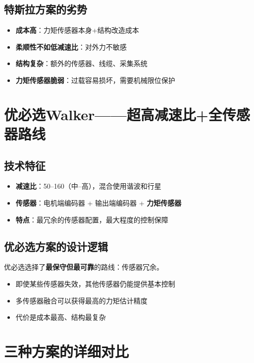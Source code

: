 \subsection{特斯拉方案的劣势}

\begin{itemize}
  \item \textbf{成本高}：力矩传感器本身+结构改造成本
  \item \textbf{柔顺性不如低减速比}：对外力不敏感
  \item \textbf{结构复杂}：额外的传感器、线缆、采集系统
  \item \textbf{力矩传感器脆弱}：过载容易损坏，需要机械限位保护
\end{itemize}

\section{优必选Walker——超高减速比+全传感器路线}

\subsection{技术特征}

\begin{itemize}
  \item \textbf{减速比}：50--160（中--高），混合使用谐波和行星
  \item \textbf{传感器}：电机端编码器 + 输出端编码器 + \textbf{力矩传感器}
  \item \textbf{特点}：最冗余的传感器配置，最大程度的控制保障
\end{itemize}

\subsection{优必选方案的设计逻辑}

优必选选择了\textbf{最保守但最可靠}的路线：传感器冗余。
\begin{itemize}
  \item 即使某些传感器失效，其他传感器仍能提供基本控制
  \item 多传感器融合可以获得最高的力矩估计精度
  \item 代价是成本最高、结构最复杂
\end{itemize}

\section{三种方案的详细对比}

